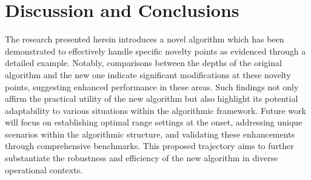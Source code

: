 \section{Discussion and Conclusions}
\label{sec:conclusion}



The research presented herein introduces a novel algorithm which has been demonstrated to effectively handle specific novelty points as evidenced through a detailed example. Notably, comparisons between the depths of the original algorithm and the new one indicate significant modifications at these novelty points, suggesting enhanced performance in these areas. Such findings not only affirm the practical utility of the new algorithm but also highlight its potential adaptability to various situations within the algorithmic framework. Future work will focus on establishing optimal range settings at the onset, addressing unique scenarios within the algorithmic structure, and validating these enhancements through comprehensive benchmarks. This proposed trajectory aims to further substantiate the robustness and efficiency of the new algorithm in diverse operational contexts.
